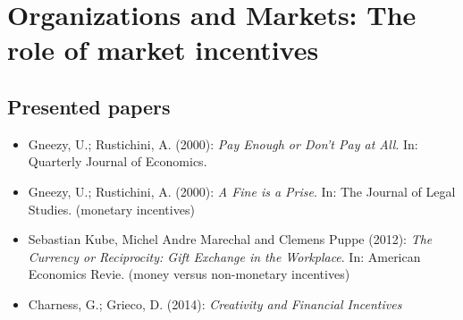 

\chapter{Organizations and Markets: The role of market incentives}

\section{Presented papers}

\begin{itemize}
	\item Gneezy, U.; Rustichini, A. (2000): \textit{Pay Enough or Don't Pay at All}. In: Quarterly Journal of Economics.
	\item Gneezy, U.; Rustichini, A. (2000): \textit{A Fine is a Prise}. In: The Journal of Legal Studies. (monetary incentives)
	\item Sebastian Kube, Michel Andre Marechal and Clemens Puppe (2012): \textit{The Currency or Reciprocity: Gift Exchange in the Workplace}. In: American Economics Revie. (money versus non-monetary incentives)
	\item Charness, G.; Grieco, D. (2014): \textit{Creativity and Financial Incentives} %
\end{itemize}


\newpage
